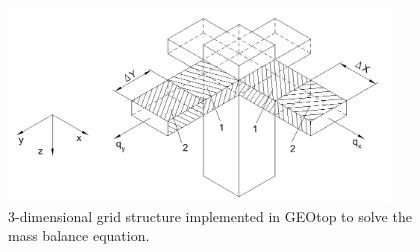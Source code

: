 \begin{figure}[!h]
\begin{center}
   \includegraphics[width=0.9\textwidth]{./images/pic_template/3Dscheme.pdf}
    \caption{3-dimensional grid structure implemented in GEOtop to solve the mass balance equation.} \label{3Dscheme}
\end{center}
\end{figure}

